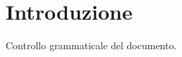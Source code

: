 

\primapagina

\section{Introduzione}
\label{sec:introduzione}

Controllo grammaticale del documento.

